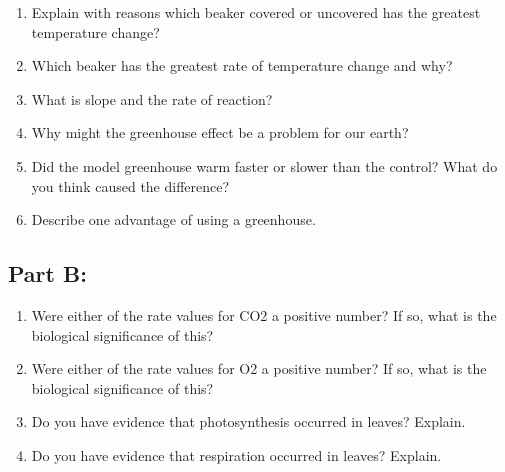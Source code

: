 \documentclass[a4paper, 12pt, english]{article}
\begin{document}
\begin{enumerate}
	\item Explain with reasons which beaker covered or uncovered has the greatest
	      temperature change?
	\item Which beaker has the greatest rate of temperature change and why?
	\item What is slope and the rate of reaction?
	\item Why might the greenhouse effect be a problem for our earth?
	\item Did the model greenhouse warm faster or slower than the control? What do you
	      think caused the difference?
	\item Describe one advantage of using a greenhouse.
\end{enumerate}

\subsection{Part B:}

\begin{enumerate}
	\item Were either of the rate values for CO2 a positive number? If so, what is the
	      biological significance of this?
	\item Were either of the rate values for O2 a positive number? If so, what is the
	      biological significance of this?
	\item Do you have evidence that photosynthesis occurred in leaves? Explain.
	\item Do you have evidence that respiration occurred in leaves? Explain.
\end{enumerate}
\end{document}
